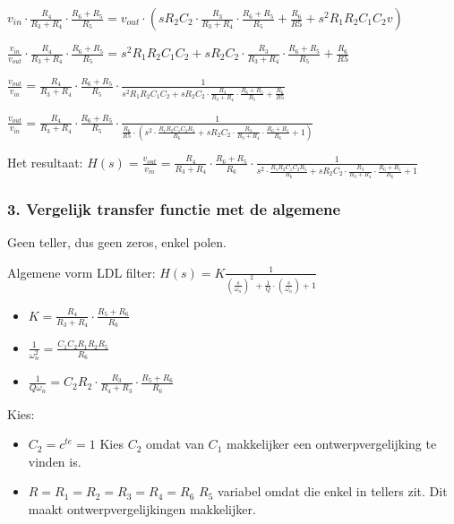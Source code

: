 \documentclass[a4paper,]{article}
\providecommand{\tightlist}{%
  \setlength{\itemsep}{0pt}\setlength{\parskip}{0pt}}
\begin{document}
\(v_{in} \cdot \frac{R_4}{R_3+R_4} \cdot \frac{R_6+R_5}{R_5} = v_{out} \cdot (sR_2C_2 \cdot \frac{R_3}{R_3+R_4} \cdot \frac{R_6+R_5}{R_5} + \frac{R_6}{R5} + s^2R_1R_2C_1C_2v)\)

\(\frac{v_{in}}{v_{out}} \cdot \frac{R_4}{R_3+R_4} \cdot \frac{R_6+R_5}{R_5} = s^2R_1R_2C_1C_2 + sR_2C_2 \cdot \frac{R_3}{R_3+R_4} \cdot \frac{R_6+R_5}{R_5} + \frac{R_6}{R5}\)

\(\frac{v_{out}}{v_{in}} = \frac{R_4}{R_3+R_4} \cdot \frac{R_6+R_5}{R_5} \cdot \frac{1}{s^2R_1R_2C_1C_2 + sR_2C_2 \cdot \frac{R_3}{R_3+R_4} \cdot \frac{R_6+R_5}{R_5} + \frac{R_6}{R5}}\)

\(\frac{v_{out}}{v_{in}} = \frac{R_4}{R_3+R_4} \cdot \frac{R_6+R_5}{R_5} \cdot \frac{1}{\frac{R_6}{R5} \cdot (s^2 \cdot \frac{R_1R_2C_1C_2R_5}{R_6} + sR_2C_2 \cdot \frac{R_3}{R_3+R_4} \cdot \frac{R_6+R_5}{R_6} + 1)}\)

Het resultaat:
\(H(s) = \frac{v_{out}}{v_{in}} = \frac{R_4}{R_3+R_4} \cdot \frac{R_6+R_5}{R_6} \cdot \frac{1}{s^2 \cdot \frac{R_1R_2C_1C_2R_5}{R_6} + sR_2C_2 \cdot \frac{R_3}{R_3+R_4} \cdot \frac{R_6+R_5}{R_6} + 1}\)

\hypertarget{vergelijk-transfer-functie-met-de-algemene}{%
\subsubsection{3. Vergelijk transfer functie met de
algemene}\label{vergelijk-transfer-functie-met-de-algemene}}

Geen teller, dus geen zeros, enkel polen.

Algemene vorm LDL filter:
\(H(s) = K\frac{1}{(\frac{s}{\omega_n})^2+\frac{1}{Q}\cdot(\frac{s}{\omega_n})+1}\)

\begin{itemize}
\tightlist
\item
  \(K=\frac{R_4}{R_3+R_4} \cdot \frac{R_5+R_6}{R_6}\)
\item
  \(\frac{1}{\omega_n^2} = \frac{C_1C_2R_1R_2R_5}{R_6}\)
\item
  \(\frac{1}{Q\omega_n}=C_2R_2 \cdot \frac{R_3}{R_4+R_3} \cdot \frac{R_5+R_6}{R_6}\)
\end{itemize}

Kies:

\begin{itemize}
\tightlist
\item
  \(C_2 = c^{te} = 1\) Kies \(C_2\) omdat van \(C_1\) makkelijker een
  ontwerpvergelijking te vinden is.
\item
  \(R = R_1 = R_2 = R_3 = R_4 = R_6\) \(R_5\) variabel omdat die enkel
  in tellers zit. Dit maakt ontwerpvergelijkingen makkelijker.
\end{itemize}
\end{document}
